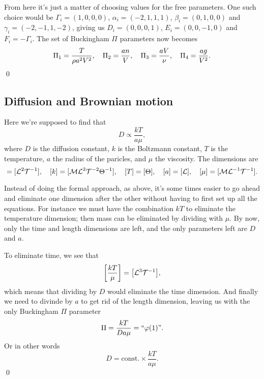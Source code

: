 \documentclass[11pt,letter, swedish, english
]{article}
\begin{document}
From here it's just a matter of choosing values for the free
parameters. One such choice would be $\Gamma_i=(1, 0, 0, 0)$, 
$\alpha_i=(-2, 1, 1, 1)$, $\beta_i=(0, 1, 0, 0)$ and
$\gamma_i=(-2, -1, 1, -2)$, giving us $D_i=(0, 0, 0, 1)$, 
$E_i=(0, 0, -1, 0)$ and $F_i=-\Gamma_i$.
The set of Buckingham $\Pi$
parameters now becomes
\begin{equation}
\Pi_1=\frac{T}{\rho a^2V^2}\qcomma \Pi_2=\frac{an}{V}\qcomma
\Pi_3=\frac{aV}{\nu}\qcomma \Pi_4=\frac{ag}{V^2}.
\end{equation}
\qed

\subsection{Diffusion and Brownian motion}
Here we're supposed to find that
\begin{equation}
D\propto\frac{kT}{a\mu},
\end{equation}
where $D$ is the diffusion constant, $k$ is the Boltzmann constant,
$T$ is the temperature, $a$ the radius of the paricles, and $\mu$ the
viscosity. The dimensions are
\begin{equation}
[D]=[\mathcal{L}^2\mathcal{T}^{-1}]\qcomma [k]=[\mathcal{ML}^2\mathcal{T}^{-2}\Theta^{-1}]\qcomma 
[T]=[\Theta]\qcomma 
[a]=[\mathcal{L}]\qcomma [\mu]=[\mathcal{ML}^{-1}\mathcal{T}^{-1}].
\end{equation}

Instead of doing the formal approach, as above, it's some times easier
to go ahead and eliminate one dimension after the other without
having to first set up all the equations. For instance we must have the
combination $kT$ to eliminate the temperature dimension; then mass can
be eliminated by dividing with $\mu$. By now, only the time and length
dimensions are left, and the only parameters left are $D$ and $a$. 

To eliminate time, we see that
\begin{equation}
\qty[\frac{kT}{\mu}] = \qty[\mathcal{L}^3\mathcal{T}^{-1}],
\end{equation}
which means that dividing by $D$ would eliminate the time
dimension. And finally we need to divinde by $a$ to get rid of the
length dimension, leaving us with the only Buckingham $\Pi$ parameter
\begin{equation}
\Pi=\frac{kT}{Da\mu} = ``\varphi(1)\text{''}.
\end{equation}
Or in other words
\begin{equation}
D=\text{const.}\times\frac{kT}{a\mu}.
\end{equation}
\qed
\end{document}
